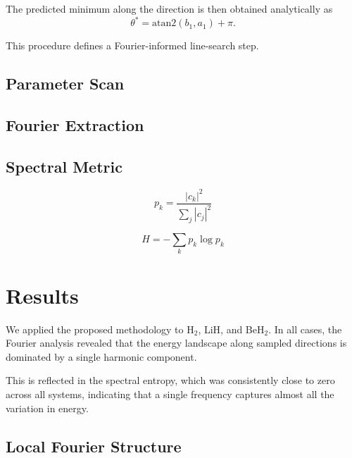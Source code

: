 \documentclass[12pt]{article}
\begin{document}
The predicted minimum along the direction is then obtained analytically as
\begin{equation}
\theta^* = \mathrm{atan2}(b_1, a_1) + \pi.
\end{equation}

This procedure defines a Fourier-informed line-search step.

\subsection{Parameter Scan}


\subsection{Fourier Extraction}


\subsection{Spectral Metric}

\begin{equation}
p_k = \frac{|c_k|^2}{\sum_j |c_j|^2}
\end{equation}

\begin{equation}
H = -\sum_k p_k \log p_k
\end{equation}


\section{Results}

We applied the proposed methodology to H$_2$, LiH, and BeH$_2$. In all cases, the Fourier analysis revealed that the energy landscape along sampled directions is dominated by a single harmonic component.

This is reflected in the spectral entropy, which was consistently close to zero across all systems, indicating that a single frequency captures almost all the variation in energy.

\subsection{Local Fourier Structure}
\end{document}
